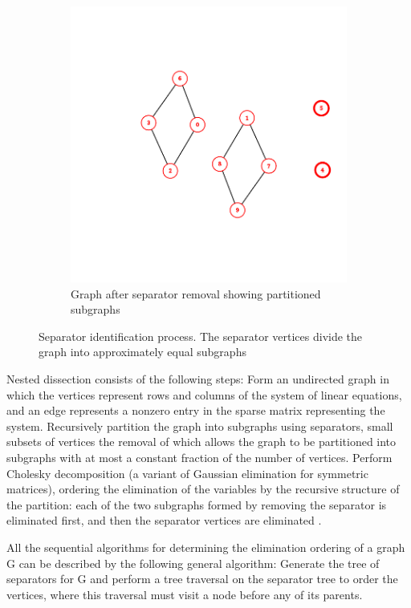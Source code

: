 \begin{figure}[htbp]
\begin{subfigure}[b]{0.45\textwidth}
        \includegraphics[width=\textwidth]{fig/background/nd-2.png}
        \caption{Graph after separator removal showing partitioned subgraphs}
        \label{fig:nd-separated}
    \end{subfigure}
    \caption{Separator identification process. The separator vertices divide the graph into approximately equal subgraphs}
    \label{fig:nested-dissection}
\end{figure}

Nested dissection consists of the following steps: Form an undirected graph in which the vertices represent rows and columns of the system of linear equations, and an edge represents a nonzero entry in the sparse matrix representing the system. Recursively partition the graph into subgraphs using separators, small subsets of vertices the removal of which allows the graph to be partitioned into subgraphs with at most a constant fraction of the number of vertices. Perform Cholesky decomposition (a variant of Gaussian elimination for symmetric matrices), ordering the elimination of the variables by the recursive structure of the partition: each of the two subgraphs formed by removing the separator is eliminated first, and then the separator vertices are eliminated \cite{george_nested_1973}. 

All the sequential algorithms for determining the elimination ordering of a graph G can be described by the following general algorithm: Generate the tree of separators for G and perform a tree traversal on the separator tree to order the vertices, where this traversal must visit a node before any of its parents.



